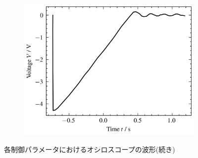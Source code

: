 \begin{figure}
\begin{subfigure}{0.48\columnwidth}
		\label{fig:oscilloscope-each-p80-d80}
	\end{subfigure}
	\begin{subfigure}{0.48\columnwidth}
		\centering
		\includegraphics[width=0.8\linewidth]{src/figures/oscilloscope-each/p80-d100-oscilloscope.csv.png}
		\label{fig:oscilloscope-each-p80-d100}
	\end{subfigure}
	\caption{各制御パラメータにおけるオシロスコープの波形(続き)}
\end{figure}


